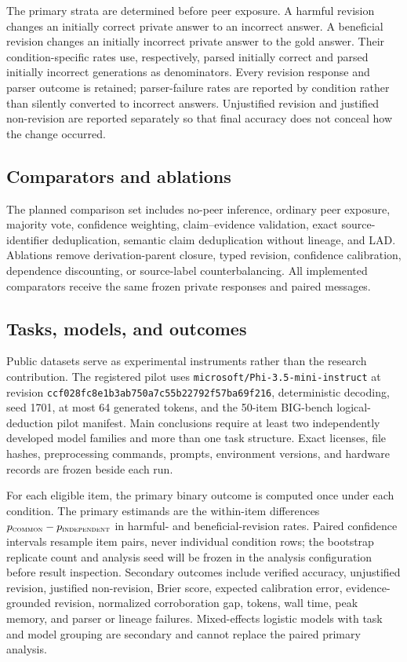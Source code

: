 \documentclass[11pt]{article}
\newcommand{\lad}{\textsc{LAD}}
\begin{document}
The primary strata are determined before peer exposure. A harmful revision changes an initially correct private answer to an incorrect answer. A beneficial revision changes an initially incorrect private answer to the gold answer. Their condition-specific rates use, respectively, parsed initially correct and parsed initially incorrect generations as denominators. Every revision response and parser outcome is retained; parser-failure rates are reported by condition rather than silently converted to incorrect answers. Unjustified revision and justified non-revision are reported separately so that final accuracy does not conceal how the change occurred.

\subsection{Comparators and ablations}

The planned comparison set includes no-peer inference, ordinary peer exposure, majority vote, confidence weighting, claim--evidence validation, exact source-identifier deduplication, semantic claim deduplication without lineage, and \lad. Ablations remove derivation-parent closure, typed revision, confidence calibration, dependence discounting, or source-label counterbalancing. All implemented comparators receive the same frozen private responses and paired messages.

\subsection{Tasks, models, and outcomes}

Public datasets serve as experimental instruments rather than the research contribution. The registered pilot uses \texttt{microsoft/Phi-3.5-mini-instruct} at revision \texttt{ccf028fc8e1b3ab750a7c55b22792f57ba69f216}, deterministic decoding, seed 1701, at most 64 generated tokens, and the 50-item BIG-bench logical-deduction pilot manifest. Main conclusions require at least two independently developed model families and more than one task structure. Exact licenses, file hashes, preprocessing commands, prompts, environment versions, and hardware records are frozen beside each run.

For each eligible item, the primary binary outcome is computed once under each condition. The primary estimands are the within-item differences $p_{\textsc{common}}-p_{\textsc{independent}}$ in harmful- and beneficial-revision rates. Paired confidence intervals resample item pairs, never individual condition rows; the bootstrap replicate count and analysis seed will be frozen in the analysis configuration before result inspection. Secondary outcomes include verified accuracy, unjustified revision, justified non-revision, Brier score, expected calibration error, evidence-grounded revision, normalized corroboration gap, tokens, wall time, peak memory, and parser or lineage failures. Mixed-effects logistic models with task and model grouping are secondary and cannot replace the paired primary analysis.
\end{document}
